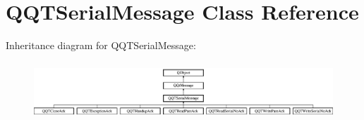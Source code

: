 \hypertarget{class_q_q_t_serial_message}{}\section{Q\+Q\+T\+Serial\+Message Class Reference}
\label{class_q_q_t_serial_message}
Inheritance diagram for Q\+Q\+T\+Serial\+Message\+:\begin{figure}[H]
\begin{center}
\leavevmode
\includegraphics[height=2.176871cm]{class_q_q_t_serial_message}
\end{center}
\end{figure}
